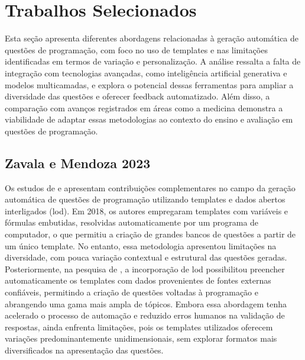 \section{Trabalhos Selecionados}
Esta seção apresenta diferentes abordagens relacionadas à geração automática de questões de programação, com foco no uso de templates e nas limitações identificadas em termos de variação e personalização. A análise ressalta a falta de integração com tecnologias avançadas, como inteligência artificial generativa e modelos multicamadas, e explora o potencial dessas ferramentas para ampliar a diversidade das questões e oferecer feedback automatizado. Além disso, a comparação com avanços registrados em áreas como a medicina demonstra a viabilidade de adaptar essas metodologias ao contexto do ensino e avaliação em questões de programação. 

\subsection{Zavala e Mendoza 2023}

Os estudos de \parencite{zalava2018} e   \parencite{zalava2023}  apresentam contribuições complementares no campo da geração automática de questões de programação utilizando templates e dados abertos interligados (\gls{lod}). Em 2018, os autores empregaram templates com variáveis e fórmulas embutidas, resolvidas automaticamente por um programa de computador, o que permitiu a criação de grandes bancos de questões a partir de um único template. No entanto, essa metodologia apresentou limitações na diversidade, com pouca variação contextual e estrutural das questões geradas. Posteriormente, na pesquisa de \cite{zalava2023}, a incorporação de \gls{lod} possibilitou preencher automaticamente os templates com dados provenientes de fontes externas confiáveis, permitindo a criação de questões voltadas à programação e abrangendo uma gama mais ampla de tópicos. Embora essa abordagem tenha acelerado o processo de automação e reduzido erros humanos na validação de respostas, ainda enfrenta limitações, pois os templates utilizados oferecem variações predominantemente unidimensionais, sem explorar formatos mais diversificados na apresentação das questões.

